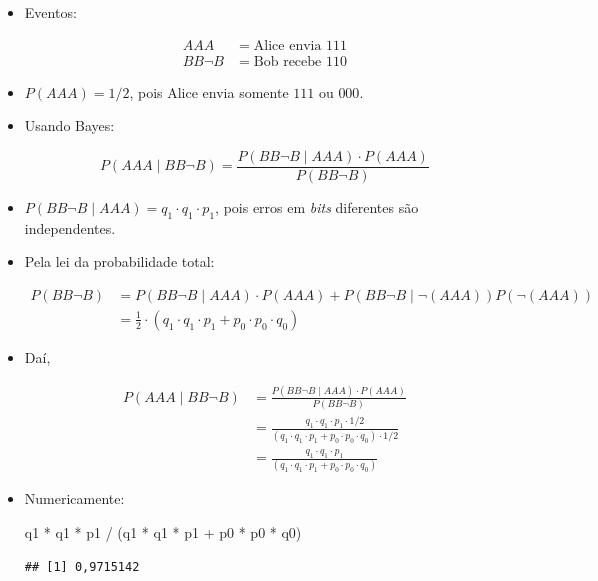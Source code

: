 \documentclass[
  11pt]{report}
\newenvironment{Shaded}{\begin{snugshade}}{\end{snugshade}}
\newcommand{\NormalTok}[1]{#1}
\newcommand{\SpecialCharTok}[1]{\textcolor[rgb]{0.00,0.00,0.00}{#1}}
\renewenvironment{Shaded}{
    \begin{mdframed}[%
      roundcorner=2pt,%
      innerleftmargin=5pt,%
      innerrightmargin=5pt,%
      topline=true,%
      leftline=true,%
      rightline=true,%
      bottomline=true,%
      linewidth=0.5pt,%
      linecolor=black!20,%
      backgroundcolor=black!2,%
      skipabove=2ex,%
      skipbelow=2.5ex%
    ]%
  }
  {
    \end{mdframed}
  }
\begin{document}
\begin{itemize}
\item
  Eventos:

  \[
  \begin{aligned}
  AAA &= \text{Alice envia } 111 \\
  BB\neg B &= \text{Bob recebe } 110
  \end{aligned}
  \]
\item
  $P(AAA) = 1/2$, pois Alice envia somente $111$ ou $000$.
\item
  Usando Bayes:

  \[
  P(AAA \mid BB\neg B) = 
  \frac{P(BB\neg B \mid AAA) \cdot P(AAA)}{P(BB\neg B)}
  \]
\item
  $P(BB\neg B \mid AAA) = q_1 \cdot q_1 \cdot p_1$, pois erros em \emph{bits} diferentes são independentes.
\item
  Pela lei da probabilidade total:

  \[
  \begin{aligned}
  P(BB\neg B) 
  &= P(BB\neg B \mid AAA) \cdot P(AAA) + 
     P(BB\neg B \mid \neg(AAA))P(\neg(AAA)) \\
  &= \frac12 \cdot \left( q_1 \cdot q_1 \cdot p_1 +
     p_0 \cdot p_0 \cdot q_0 \right)
  \end{aligned}
  \]
\item
  Daí,

  \[
  \begin{aligned}
  P(AAA \mid BB\neg B) 
  &= 
  \frac{P(BB\neg B \mid AAA) \cdot P(AAA)}{P(BB\neg B)} \\
  &= 
  \frac{
    q_1 \cdot q_1 \cdot p_1 \cdot 1/2
  }{
    \left( q_1 \cdot q_1 \cdot p_1 +
     p_0 \cdot p_0 \cdot q_0 \right)\cdot 1/2
  } \\
  &= 
  \frac{
    q_1 \cdot q_1 \cdot p_1
  }{
    \left( q_1 \cdot q_1 \cdot p_1 +
     p_0 \cdot p_0 \cdot q_0 \right)
  }
  \end{aligned}
  \]
\item
  Numericamente:

\begin{Shaded}
\begin{Highlighting}[]
\NormalTok{q1 }\SpecialCharTok{*}\NormalTok{ q1 }\SpecialCharTok{*}\NormalTok{ p1 }\SpecialCharTok{/}\NormalTok{ (q1 }\SpecialCharTok{*}\NormalTok{ q1 }\SpecialCharTok{*}\NormalTok{ p1 }\SpecialCharTok{+}\NormalTok{ p0 }\SpecialCharTok{*}\NormalTok{ p0 }\SpecialCharTok{*}\NormalTok{ q0)}
\end{Highlighting}
\end{Shaded}

\begin{verbatim}
## [1] 0,9715142
\end{verbatim}
\end{itemize}
\end{document}
